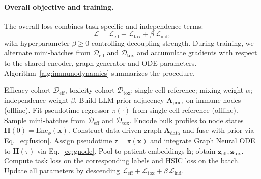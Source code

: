 \documentclass{article}
\begin{document}
\paragraph{Overall objective and training.}
The overall loss combines task-specific and independence terms:
\begin{equation}
\mathcal{L}
= \mathcal{L}_{\mathrm{eff}} + \mathcal{L}_{\mathrm{tox}}
+ \beta\,\mathcal{L}_{\mathrm{ind}},
\end{equation}
with hyperparameter $\beta\ge 0$ controlling decoupling strength.
During training, we alternate mini-batches from $\mathcal{D}_{\mathrm{eff}}$ and $\mathcal{D}_{\mathrm{tox}}$ and
accumulate gradients with respect to the shared encoder, graph generator and ODE parameters.
Algorithm~\ref{alg:immunodynamics} summarizes the procedure.

\begin{algorithm}[t]
\caption{Training Immuno-Dynamics}
\label{alg:immunodynamics}
\begin{algorithmic}[1]
\REQUIRE Efficacy cohort $\mathcal{D}_{\mathrm{eff}}$, toxicity cohort $\mathcal{D}_{\mathrm{tox}}$;
single-cell reference; mixing weight $\alpha$; independence weight $\beta$.
\STATE Build LLM-prior adjacency $\mathbf{A}_{\mathrm{prior}}$ on immune nodes (offline).
\STATE Fit pseudotime regressor $\pi(\cdot)$ from single-cell reference (offline).
    \STATE Sample mini-batches from $\mathcal{D}_{\mathrm{eff}}$ and $\mathcal{D}_{\mathrm{tox}}$.
        \STATE Encode bulk profiles to node states $\mathbf{H}(0)=\mathrm{Enc}_\phi(\mathbf{x})$.
        \STATE Construct data-driven graph $\mathbf{A}_{\mathrm{data}}$ and fuse with prior via Eq.~\eqref{eq:fusion}.
        \STATE Assign pseudotime $\tau=\pi(\mathbf{x})$ and integrate Graph Neural ODE to $\mathbf{H}(\tau)$ via Eq.~\eqref{eq:gnode}.
        \STATE Pool to patient embeddings $\mathbf{h}$; obtain $\mathbf{z}_{\mathrm{eff}},\mathbf{z}_{\mathrm{tox}}$.
        \STATE Compute task loss on the corresponding labels and HSIC loss on the batch.
    \ENDFOR
    \STATE Update all parameters by descending $\mathcal{L}_{\mathrm{eff}}+\mathcal{L}_{\mathrm{tox}}+\beta\,\mathcal{L}_{\mathrm{ind}}$.
\ENDFOR
\end{algorithmic}
\end{algorithm}

\end{document}
